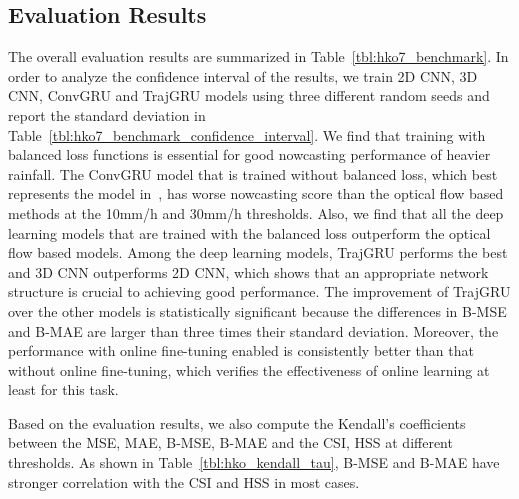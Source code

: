 \documentclass{article}
\begin{document}
\subsection{Evaluation Results}
The overall evaluation results are summarized in Table~\ref{tbl:hko7_benchmark}. In order to analyze the confidence interval of the results, we train 2D CNN, 3D CNN, ConvGRU and TrajGRU models using three different random seeds and report the standard deviation in Table~\ref{tbl:hko7_benchmark_confidence_interval}. We find that training with balanced loss functions is essential for good nowcasting performance of heavier rainfall. The ConvGRU model that is trained without balanced loss, which best represents the model in~\cite{xingjian2015convolutional}, has worse nowcasting score than the optical flow based methods at the 10mm/h and 30mm/h thresholds. Also, we find that all the deep learning models that are trained with the balanced loss outperform the optical flow based models. Among the deep learning models, TrajGRU performs the best and 3D CNN outperforms 2D CNN, which shows that an appropriate network structure is crucial to achieving good performance. The improvement of TrajGRU over the other models is statistically significant because the differences in B-MSE and B-MAE are larger than three times their standard deviation. Moreover, the performance with online fine-tuning enabled is consistently better than that without online fine-tuning, which verifies the effectiveness of online learning at least for this task.

Based on the evaluation results, we also compute the Kendall's  coefficients~\cite{kendall1938new} between the MSE, MAE, B-MSE, B-MAE and the CSI, HSS at different thresholds. As shown in Table~\ref{tbl:hko_kendall_tau}, B-MSE and B-MAE have stronger correlation with the CSI and HSS in most cases.
\end{document}
